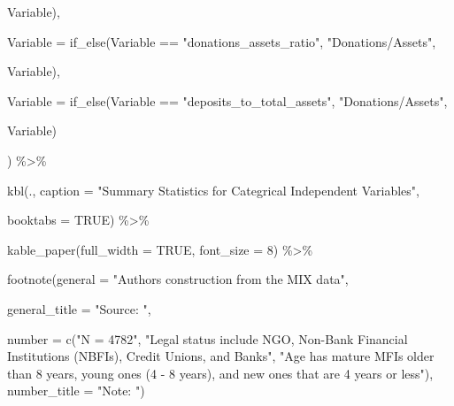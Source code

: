 \documentclass[a4paper,nobind]{templates/ociamthesis}
\newenvironment{Shaded}{\begin{snugshade}}{\end{snugshade}}
\newcommand{\AttributeTok}[1]{\textcolor[rgb]{0.77,0.63,0.00}{#1}}
\newcommand{\ConstantTok}[1]{\textcolor[rgb]{0.00,0.00,0.00}{#1}}
\newcommand{\DecValTok}[1]{\textcolor[rgb]{0.00,0.00,0.81}{#1}}
\newcommand{\FunctionTok}[1]{\textcolor[rgb]{0.00,0.00,0.00}{#1}}
\newcommand{\NormalTok}[1]{#1}
\newcommand{\SpecialCharTok}[1]{\textcolor[rgb]{0.00,0.00,0.00}{#1}}
\newcommand{\StringTok}[1]{\textcolor[rgb]{0.31,0.60,0.02}{#1}}
\renewenvironment{Shaded}
{
  \vspace{10pt}%
  \begin{snugshade}%
}{%
  \end{snugshade}%
  \vspace{8pt}%
}
\begin{document}
\begin{landscape}
\begin{Shaded}
\begin{Highlighting}[]
\NormalTok{                            Variable), }
         
         \AttributeTok{Variable =} \FunctionTok{if\_else}\NormalTok{(Variable }\SpecialCharTok{==} \StringTok{"donations\_assets\_ratio"}\NormalTok{, }\StringTok{"Donations/Assets"}\NormalTok{, }
                            
\NormalTok{                            Variable),}
         
         \AttributeTok{Variable =} \FunctionTok{if\_else}\NormalTok{(Variable }\SpecialCharTok{==} \StringTok{"deposits\_to\_total\_assets"}\NormalTok{, }\StringTok{"Donations/Assets"}\NormalTok{, }
                            
\NormalTok{                            Variable)}
         
         
\NormalTok{         ) }\SpecialCharTok{\%\textgreater{}\%} 
  
  \FunctionTok{kbl}\NormalTok{(., }\AttributeTok{caption =} \StringTok{"Summary Statistics for Categrical Independent Variables"}\NormalTok{, }
      
      \AttributeTok{booktabs =} \ConstantTok{TRUE}\NormalTok{) }\SpecialCharTok{\%\textgreater{}\%} 
  
  \FunctionTok{kable\_paper}\NormalTok{(}\AttributeTok{full\_width =} \ConstantTok{TRUE}\NormalTok{, }\AttributeTok{font\_size =} \DecValTok{8}\NormalTok{) }\SpecialCharTok{\%\textgreater{}\%} 
  
  \FunctionTok{footnote}\NormalTok{(}\AttributeTok{general =} \StringTok{"Authors\textquotesingle{} construction from the MIX data"}\NormalTok{,}
           
           \AttributeTok{general\_title =} \StringTok{"Source: "}\NormalTok{,}
           
           \AttributeTok{number =} \FunctionTok{c}\NormalTok{(}\StringTok{"N = 4782"}\NormalTok{, }\StringTok{"Legal status include NGO, Non{-}Bank Financial Institutions (NBFIs), Credit Unions, and Banks"}\NormalTok{, }\StringTok{"Age has mature MFIs older than 8 years, young ones (4 {-} 8 years), and new ones that are 4 years or less"}\NormalTok{),}
           \AttributeTok{number\_title =} \StringTok{"Note: "}\NormalTok{)}
\end{Highlighting}
\end{Shaded}

\begin{table}


\end{table}
\end{landscape}
\end{document}
